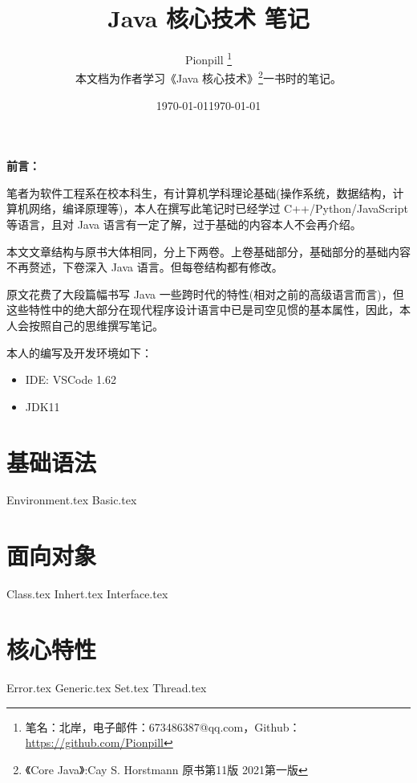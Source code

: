 \documentclass{PionpillNote-book}
\title{Java 核心技术 笔记}
\author{
    Pionpill \footnote{笔名：北岸，电子邮件：673486387@qq.com，Github：\url{https://github.com/Pionpill}} \\
    本文档为作者学习《Java 核心技术》\footnote{《Core Java》:Cay S. Horstmann 原书第11版 2021第一版}一书时的笔记。\\
}
\date{\today}
\begin{document}
\pagestyle{plain}
\maketitle

\noindent\textbf{前言：}

笔者为软件工程系在校本科生，有计算机学科理论基础(操作系统，数据结构，计算机网络，编译原理等)，本人在撰写此笔记时已经学过 C++/Python/JavaScript 等语言，且对 Java 语言有一定了解，过于基础的内容本人不会再介绍。

本文文章结构与原书大体相同，分上下两卷。上卷基础部分，基础部分的基础内容不再赘述，下卷深入 Java 语言。但每卷结构都有修改。

原文花费了大段篇幅书写 Java 一些跨时代的特性(相对之前的高级语言而言)，但这些特性中的绝大部分在现代程序设计语言中已是司空见惯的基本属性，因此，本人会按照自己的思维撰写笔记。

本人的编写及开发环境如下：
\begin{itemize}
    \item IDE: VSCode 1.62
    \item JDK11
\end{itemize}

\date{\today}
\newpage

\tableofcontents

\newpage

\setcounter{page}{1} 
\pagestyle{fancy}

\chapter{基础语法}
{Environment.tex} 
{Basic.tex}
\chapter{面向对象}
{Class.tex}
{Inhert.tex}
{Interface.tex}
\chapter{核心特性}
{Error.tex}
{Generic.tex}
{Set.tex}
{Thread.tex}
\end{document}
